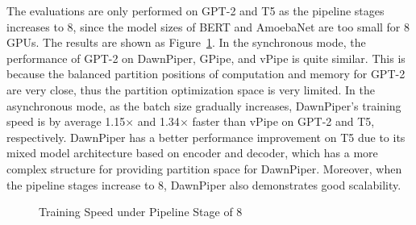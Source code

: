 The evaluations are only performed on GPT-2 and T5 as the pipeline stages increases to 8,
since the model sizes of BERT and AmoebaNet are too small for 8 GPUs.
The results are shown as Figure~\ref{fig:perf-8}.
In the synchronous mode, the performance of GPT-2 on DawnPiper, GPipe, and vPipe is quite similar.
This is because the balanced partition positions of computation and memory for GPT-2
are very close, thus the partition optimization space is very limited.
In the asynchronous mode,
as the batch size gradually increases,
DawnPiper's training speed is by average 1.15$\times$ and 1.34$\times$
faster than vPipe on GPT-2 and T5, respectively.
DawnPiper has a better performance improvement on T5
due to its mixed model architecture based on encoder and decoder,
which has a more complex structure for providing partition space for DawnPiper.
Moreover, when the pipeline stages increase to 8,
DawnPiper also demonstrates good scalability.

\begin{figure}[htb]
  \centering
  \caption{Training Speed under Pipeline Stage of 8}
  \label{fig:perf-8}
\end{figure}

